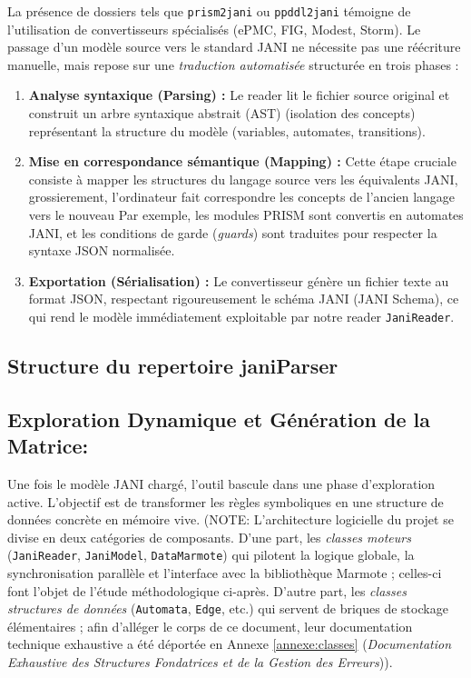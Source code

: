 \documentclass[14pt, a4paper]{extarticle}
\begin{document}
La présence de dossiers tels que \texttt{prism2jani} ou \texttt{ppddl2jani} témoigne de l'utilisation de convertisseurs spécialisés (ePMC, FIG, Modest, Storm). Le passage d'un modèle source vers le standard JANI ne nécessite pas une réécriture manuelle, mais repose sur une \textit{traduction automatisée} structurée en trois phases :

\begin{enumerate}
    \item \textbf{Analyse syntaxique (Parsing) :} Le reader lit le fichier source original et construit un arbre syntaxique abstrait (AST) (isolation des concepts) représentant la structure du modèle (variables, automates, transitions).
    \item \textbf{Mise en correspondance sémantique (Mapping) :} Cette étape cruciale consiste à mapper les structures du langage source vers les équivalents JANI, grossierement, l'ordinateur fait correspondre les concepts de l'ancien langage vers le nouveau Par exemple, les modules PRISM sont convertis en automates JANI, et les conditions de garde (\textit{guards}) sont traduites pour respecter la syntaxe JSON normalisée.
    \item \textbf{Exportation (Sérialisation) :} Le convertisseur génère un fichier texte au format JSON, respectant rigoureusement le schéma JANI (JANI Schema), ce qui rend le modèle immédiatement exploitable par notre reader \texttt{JaniReader}.
\end{enumerate}

\subsection{Structure du repertoire janiParser}

\begin{center}
\end{center}


\subsection{ Exploration Dynamique et Génération de la Matrice:}

Une fois le modèle JANI chargé, l'outil bascule dans une phase d'exploration active. L'objectif est de transformer les règles symboliques en une structure de données concrète en mémoire vive.
(NOTE: L'architecture logicielle du projet se divise en deux catégories de composants. D'une part, les \textit{classes moteurs} (\texttt{JaniReader}, \texttt{JaniModel}, \texttt{DataMarmote}) qui pilotent la logique globale, la synchronisation parallèle et l'interface avec la bibliothèque Marmote ; celles-ci font l'objet de l'étude méthodologique ci-après. D'autre part, les \textit{classes structures de données} (\texttt{Automata}, \texttt{Edge}, etc.) qui servent de briques de stockage élémentaires ; afin d'alléger le corps de ce document, leur documentation technique exhaustive a été déportée en Annexe \ref{annexe:classes} (\textit{Documentation Exhaustive des Structures Fondatrices et de la Gestion des Erreurs})).
\end{document}
